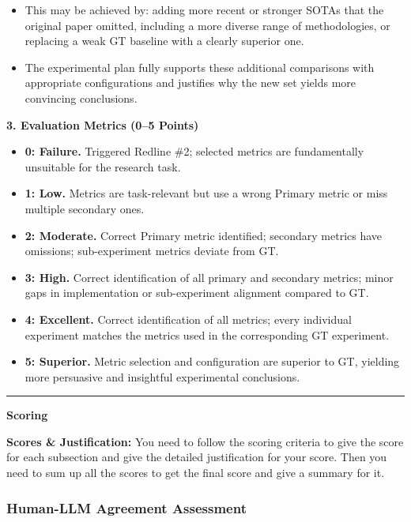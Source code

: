 \begin{tcolorbox}[
	title={Box 7: Full Evaluation Prompt},
	colback=blue!3!white,
	colframe=blue!30!black,
	colbacktitle=blue!15!white,
	coltitle=black,
	fonttitle=\bfseries,
	arc=3mm,
	boxrule=0.8pt,
	breakable
]
\begin{itemize}[nosep,leftmargin=12pt]
\begin{itemize}[nosep,leftmargin=16pt]
		\item This may be achieved by: adding more recent or stronger SOTAs that the original paper omitted, including a more diverse range of methodologies, or replacing a weak GT baseline with a clearly superior one.
		\item The experimental plan fully supports these additional comparisons with appropriate configurations and justifies why the new set yields more convincing conclusions.
	\end{itemize}
\end{itemize}

\medskip
\textbf{3. Evaluation Metrics (0--5 Points)}

\begin{itemize}[nosep,leftmargin=12pt]
	\item \textbf{0: Failure.} Triggered Redline \#2; selected metrics are fundamentally unsuitable for the research task.
	\item \textbf{1: Low.} Metrics are task-relevant but use a wrong Primary metric or miss multiple secondary ones.
	\item \textbf{2: Moderate.} Correct Primary metric identified; secondary metrics have omissions; sub-experiment metrics deviate from GT.
	\item \textbf{3: High.} Correct identification of all primary and secondary metrics; minor gaps in implementation or sub-experiment alignment compared to GT.
	\item \textbf{4: Excellent.} Correct identification of all metrics; every individual experiment matches the metrics used in the corresponding GT experiment.
	\item \textbf{5: Superior.} Metric selection and configuration are superior to GT, yielding more persuasive and insightful experimental conclusions.
\end{itemize}

\medskip\hrule\medskip

\textbf{Scoring}

\textbf{Scores \& Justification:} You need to follow the scoring criteria to give the score for each subsection and give the detailed justification for your score. Then you need to sum up all the scores to get the final score and give a summary for it.
\end{tcolorbox}

\subsubsection{Human-LLM Agreement Assessment}

